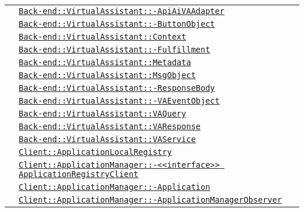 \begin{longtable}{|>{\centering}m{3cm}|m{10cm}<{\centering}|}
& \hyperref[Back-end::VirtualAssistant::ApiAiVAAdapter]{\texttt{Back-end::VirtualAssistant::-\linebreak ApiAiVAAdapter}}\\
& \hyperref[Back-end::VirtualAssistant::ButtonObject]{\texttt{Back-end::VirtualAssistant::-\linebreak ButtonObject}}\\
& \hyperref[Back-end::VirtualAssistant::Context]{\texttt{Back-end::VirtualAssistant::Context}}\\
& \hyperref[Back-end::VirtualAssistant::Fulfillment]{\texttt{Back-end::VirtualAssistant::-\linebreak Fulfillment}}\\
& \hyperref[Back-end::VirtualAssistant::Metadata]{\texttt{Back-end::VirtualAssistant::Metadata}}\\
& \hyperref[Back-end::VirtualAssistant::MsgObject]{\texttt{Back-end::VirtualAssistant::MsgObject}}\\
& \hyperref[Back-end::VirtualAssistant::ResponseBody]{\texttt{Back-end::VirtualAssistant::-\linebreak ResponseBody}}\\
& \hyperref[Back-end::VirtualAssistant::VAEventObject]{\texttt{Back-end::VirtualAssistant::-\linebreak VAEventObject}}\\
& \hyperref[Back-end::VirtualAssistant::VAQuery]{\texttt{Back-end::VirtualAssistant::VAQuery}}\\
& \hyperref[Back-end::VirtualAssistant::VAResponse]{\texttt{Back-end::VirtualAssistant::VAResponse}}\\
& \hyperref[Back-end::VirtualAssistant::VAService]{\texttt{Back-end::VirtualAssistant::VAService}}\\
& \hyperref[Client::ApplicationLocalRegistry]{\texttt{Client::ApplicationLocalRegistry}}\\
& \hyperref[Client::ApplicationManager::<<interface>> ApplicationRegistryClient]{\texttt{Client::ApplicationManager::-\linebreak <<interface>> ApplicationRegistryClient}}\\
& \hyperref[Client::ApplicationManager::Application]{\texttt{Client::ApplicationManager::-\linebreak Application}}\\
& \hyperref[Client::ApplicationManager::ApplicationManagerObserver]{\texttt{Client::ApplicationManager::-\linebreak ApplicationManagerObserver}}\\

\end{longtable}

